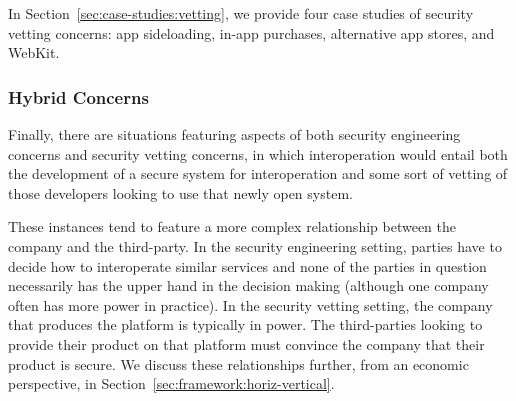 \documentclass[letterpaper,twocolumn,10pt]{article}
\begin{document}
In Section~\ref{sec:case-studies:vetting}, we provide four case studies of security vetting concerns: app sideloading, in-app purchases, alternative app stores, and WebKit.

\subsubsection{Hybrid Concerns}
\label{sec:framework:taxonomy:hyb}

Finally, there are situations featuring aspects of both security engineering concerns and security vetting concerns, in which interoperation would entail both the development of a secure system for interoperation and some sort of vetting of those developers looking to use that newly open system.

These instances tend to feature a more complex relationship between the company and the third-party.  In the security engineering setting, parties have to decide how to interoperate similar services and none of the parties in question necessarily has the upper hand in the decision making (although one company often has more power in practice). In the security vetting setting, the company that produces the platform is typically in power.  The third-parties looking to provide their product on that platform must convince the company that their product is secure. 
We discuss these relationships further, from an economic perspective, in Section~\ref{sec:framework:horiz-vertical}.

\begin{center}
\end{center}
\end{document}
